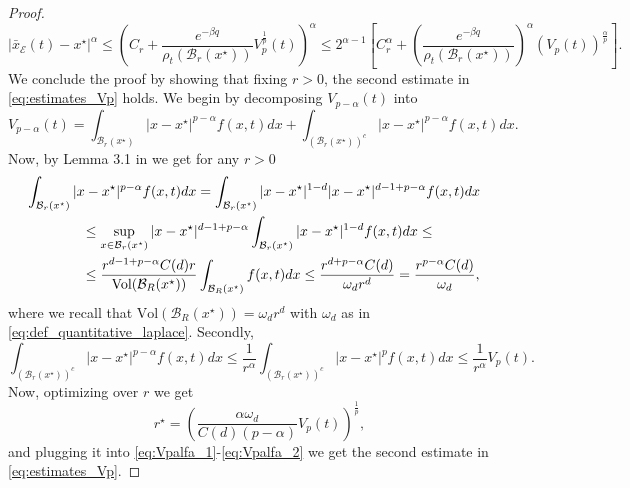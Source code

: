 \documentclass[11pt,handout]{article}%
\numberwithin{equation}{section}
\theoremstyle{definition}
\begin{document}
\begin{proof}
\begin{equation}
		\vert \bar{x}_\mathcal{E}(t) - x^\star \vert^\alpha  \leq \left(  C_r + \frac{e^{-\beta q} }{\rho_t(\mathcal{B}_r(x^\star))}  V_p^\frac{1}{p}(t)\right)^\alpha \leq 2^{\alpha-1}\left[  C_r^\alpha + \left( \frac{e^{-\beta   q} }{\rho_t(\mathcal{B}_r(x^\star))} \right)^\alpha (V_p(t))^\frac{\alpha}{p}\right].
	\end{equation}
	We conclude the proof by showing that fixing $r>0$, the second estimate in \eqref{eq:estimates_Vp} holds.
	We begin by decomposing $V_{p-\alpha}(t)$ into
	\begin{equation}
		V_{p-\alpha}(t)  = \int_{\mathcal{B}_r(x^\star)} \vert x-x^\star \vert^{p-\alpha} f(x,t) dx + \int_{(\mathcal{B}_r(x^\star))^c} \vert x-x^\star \vert^{p-\alpha} f(x,t) dx.
	\end{equation}
	Now, by Lemma 3.1 in \cite{harjulehto2018pointwise} we get for any $r>0$
	\begin{align}\label{eq:Vpalfa_1} 
		&\int_{\mathcal{B}_r(x^\star)} \vert x-x^\star \vert^{p-\alpha} f(x,t) dx =  	\int_{\mathcal{B}_r(x^\star)} \vert x-x^\star \vert^{1-d} \vert x-x^\star \vert^{d-1+p-\alpha} f(x,t) dx 
		\cr
		& \qquad \qquad \leq \sup_{x \in \mathcal{B}_r(x^\star)} \vert x-x^\star \vert^{d-1+p-\alpha} \int_{\mathcal{B}_r(x^\star)} \vert x-x^\star\vert^{1-d}f(x,t) dx \leq \cr 
		&\qquad \qquad \leq  \frac{r^{d-1+p-\alpha} C(d) r}{\text{Vol}(\mathcal{B}_R(x^\star))} \int_{\mathcal{B}_R(x^\star)} f(x,t) dx \leq \frac{r^{d+p-\alpha} C(d) }{\omega_d r^d} = \frac{r^{p-\alpha} C(d) }{\omega_d},
	\end{align}
	where we recall that $\text{Vol}(\mathcal{B}_R(x^\star)) = \omega_d r^d$ with $\omega_d$ as in \eqref{eq:def_quantitative_laplace}.
	Secondly, 
	\begin{equation}\label{eq:Vpalfa_2}
		\int_{(\mathcal{B}_r(x^\star))^c} \vert x-x^\star \vert^{p-\alpha} f(x,t) dx\leq \frac{1}{r^{\alpha}} \int_{(\mathcal{B}_r(x^\star))^c}\vert x-x^\star\vert^p f(x,t) dx \leq  \frac{1}{r^{\alpha}} V_p(t).
	\end{equation}
	Now, optimizing over $r$ we get 
	\begin{equation*}
		r^\star = \left( \frac{\alpha \omega_d}{C(d)(p-\alpha)} V_p(t)\right)^{\frac{1}{p}},
	\end{equation*}
	and plugging it into \eqref{eq:Vpalfa_1}-\eqref{eq:Vpalfa_2} we get the second estimate in \eqref{eq:estimates_Vp}. 
\end{proof}
\end{document}
